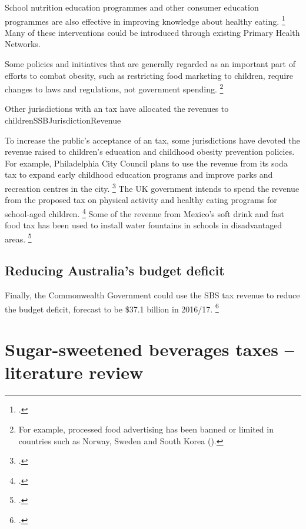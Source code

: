 \documentclass[embargoed]{grattan}
\begin{document}
School nutrition education programmes and other consumer education programmes are also effective in improving knowledge about healthy eating.%
\footcites{Research2007EvaluationNationalGo}{Capacci2012Policiespromotehealthy}{Ebbeling2002Childhoodobesitypublic}{Hawkes2013Promotinghealthydiets}{Hawkes2015Smartfoodpolicies}{Organization2016Reportcommissionending} Many of these interventions could be introduced through existing Primary Health Networks.

Some policies and initiatives that are generally regarded as an important part of efforts to combat obesity, such as restricting food marketing to children, require changes to laws and regulations, not government spending.%
\footnote{For example, processed food advertising has been banned or limited in countries such as Norway, Sweden and South Korea (\textcite{Cawley2015economyscalesselective}).}

\begin{verysmallbox}{Other jurisdictions with an \SSB{} tax have allocated the revenues to children}{SSBJurisdictionRevenue}

To increase the public's acceptance of an \SSB{} tax, some jurisdictions have devoted the revenue raised to children's education and childhood obesity prevention policies.
For example, Philadelphia City Council plans to use the revenue from its soda tax to expand early childhood education programs and improve parks and recreation centres in the city.%
\footcite{Nadolny2016Sodataxpasses} The UK government intends to spend the revenue from the proposed \SSB{} tax on physical activity and healthy eating programs for school-aged children.%
\footcite{HMTreasurysugarlevy} Some of the revenue from Mexico's soft drink and fast food tax has been used to install water fountains in schools in disadvantaged areas.%
\footcite{Soares2016Puttingtaxesdiet}
\end{verysmallbox}

\section{Reducing Australia's budget deficit}\label{reducing-australias-budget-deficit}

Finally, the Commonwealth Government could use the SBS tax revenue to reduce the budget deficit, forecast to be \$37.1 billion in 2016/17.%
\footcite{Treasury2016201617BudgetBudget}


\appendix

\onecolumn
\chapter{Sugar-sweetened beverages taxes -- literature review}\label{appendix-1-ssb-tax-literature-review-summary}
\end{document}
